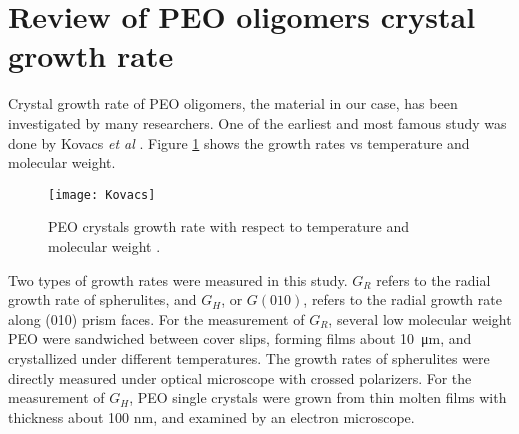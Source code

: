

\section{Review of PEO oligomers crystal growth rate}

Crystal growth rate of PEO oligomers, the material in our case, has been investigated by many researchers. One of the earliest and most famous study was done by Kovacs \textit{et al} \cite{Kovacs1975}. Figure \ref{fig:Kovacs} shows the growth rates vs temperature and molecular weight.

\begin{figure}[H]
\center
\vspace{1 cm}
\texttt{[image: Kovacs]}
\caption[PEO crystals growth rate with respect to temperature and molecular weight.]{PEO crystals growth rate with respect to temperature and molecular weight \cite{Kovacs1975}.}
\label{fig:Kovacs}
\end{figure}

Two types of growth rates were measured in this study. $G_{R}$ refers to the radial growth rate of spherulites, and $G_{H}$, or $G(010)$, refers to the radial growth rate along (010) prism faces. For the measurement of $G_{R}$, several low molecular weight PEO were sandwiched between cover slips, forming films about \SI{10}{\micro\metre}, and crystallized under different temperatures. The growth rates of spherulites were directly measured under optical microscope with crossed polarizers. For the measurement of $G_{H}$, PEO single crystals were grown from thin molten films with thickness about 100 nm, and examined by an electron microscope.

